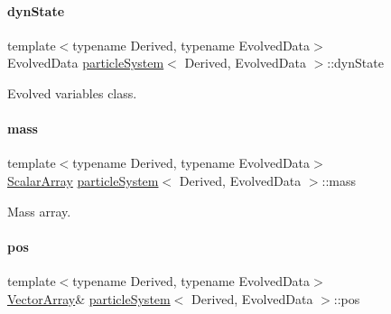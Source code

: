 \mbox{\label{classparticle_system_a68651a7d05d0799f3eda4e785fcec725}} 
\paragraph{\texorpdfstring{dyn\+State}{dynState}}
{\footnotesize\ttfamily template$<$typename Derived, typename Evolved\+Data$>$ \\
Evolved\+Data \mbox{\hyperlink{classparticle_system}{particle\+System}}$<$ Derived, Evolved\+Data $>$\+::dyn\+State}



Evolved variables class. 

\mbox{\label{classparticle_system_ada52f9d5fc33ca23a9ab6dee96d88957}} 
\paragraph{\texorpdfstring{mass}{mass}}
{\footnotesize\ttfamily template$<$typename Derived, typename Evolved\+Data$>$ \\
\mbox{\hyperlink{classparticle_system_af7f328120ff85c8b34edeed4a68b746e}{Scalar\+Array}} \mbox{\hyperlink{classparticle_system}{particle\+System}}$<$ Derived, Evolved\+Data $>$\+::mass}



Mass array. 

\mbox{\label{classparticle_system_ae845daf120c9ad16dea4f2ca1df5b11a}} 
\paragraph{\texorpdfstring{pos}{pos}}
{\footnotesize\ttfamily template$<$typename Derived, typename Evolved\+Data$>$ \\
\mbox{\hyperlink{classparticle_system_a6f66ed187a286c0d42ab2f83b8b6193b}{Vector\+Array}}\& \mbox{\hyperlink{classparticle_system}{particle\+System}}$<$ Derived, Evolved\+Data $>$\+::pos}



